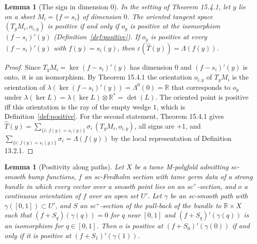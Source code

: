 \documentclass[11pt,a4paper]{article}
\theoremstyle{plain}
\newtheorem{lemma}[theorem]{Lemma}
\theoremstyle{definition}
\theoremstyle{remark}
\newcommand{\R}{\mathbb{R}}
\begin{document}
\begin{lemma}[The sign in dimension $0$]\label{lem:sign}
In the setting of Theorem 15.4.1, let $y$ lie on a sheet $M_i=\{f=s_i\}$ of dimension $0$. The oriented
tangent space $(T_yM_i,o_{i,y})$ is positive if and only if $o_y$ is positive at the isomorphism
$(f-s_i)'(y)$ (Definition~\ref{def:positive}). If $o_y$ is positive at every $(f-s_i)'(y)$ with
$f(y)=s_i(y)$, then $\varepsilon(\hat T(y))=\Lambda(f(y))$.
\end{lemma}

\begin{proof}
Since $T_yM_i=\ker(f-s_i)'(y)$ has dimension $0$ and $(f-s_i)'(y)$ is onto, it is an isomorphism. By
Theorem 15.4.1 the orientation $o_{i,y}$ of $T_yM_i$ is the orientation of
$\lambda(\ker(f-s_i)'(y))=\Lambda^0(0)=\R$ that corresponds to $o_y$ under
$\lambda(\ker L)=\lambda(\ker L)\otimes\R^*=\det(L)$. The oriented point is positive iff this orientation
is the ray of the empty wedge $1$, which is Definition~\ref{def:positive}. For the second statement,
Theorem 15.4.1 gives $\hat T(y)=\sum_{\{i:\,f(y)=s_i(y)\}}\sigma_i\,(T_yM_i,o_{i,y})$, all signs are $+1$,
and $\sum_{\{i:\,f(y)=s_i(y)\}}\sigma_i=\Lambda(f(y))$ by the local representation of
Definition 13.2.1.
\end{proof}

\begin{lemma}[Positivity along paths]\label{lem:path}
Let $X$ be a tame M-polyfold admitting sc-smooth bump functions, $f$ an sc-Fredholm section with tame
germ data of a strong bundle in which every vector over a smooth point lies on an sc$^+$-section, and
$o$ a continuous orientation of $f$ over an open set $U'$. Let $\gamma$ be an sc-smooth path with
$\gamma([0,1])\subset U'$, and $S$ an sc$^+$-section of the pull-back of the bundle to $\R\times X$ such
that $(f+S_q)(\gamma(q))=0$ for $q$ near $[0,1]$ and $(f+S_q)'(\gamma(q))$ is an isomorphism for
$q\in[0,1]$. Then $o$ is positive at $(f+S_0)'(\gamma(0))$ if and only if it is positive at
$(f+S_1)'(\gamma(1))$.
\end{lemma}
\end{document}
